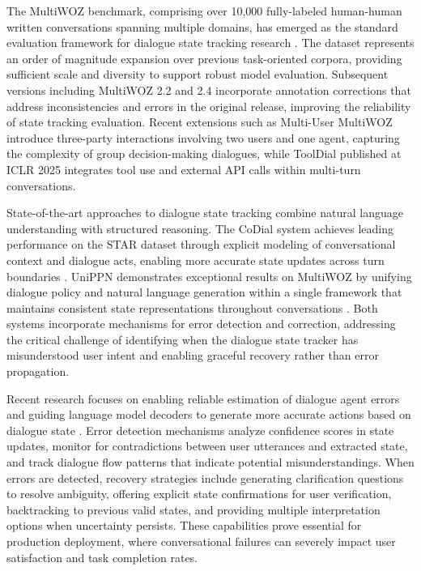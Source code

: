 The MultiWOZ benchmark, comprising over 10,000 fully-labeled human-human written conversations spanning multiple domains, has emerged as the standard evaluation framework for dialogue state tracking research \citep{budzianowski2018multiwoz}. The dataset represents an order of magnitude expansion over previous task-oriented corpora, providing sufficient scale and diversity to support robust model evaluation. Subsequent versions including MultiWOZ 2.2 and 2.4 incorporate annotation corrections that address inconsistencies and errors in the original release, improving the reliability of state tracking evaluation. Recent extensions such as Multi-User MultiWOZ introduce three-party interactions involving two users and one agent, capturing the complexity of group decision-making dialogues, while ToolDial published at ICLR 2025 integrates tool use and external API calls within multi-turn conversations.

State-of-the-art approaches to dialogue state tracking combine natural language understanding with structured reasoning. The CoDial system achieves leading performance on the STAR dataset through explicit modeling of conversational context and dialogue acts, enabling more accurate state updates across turn boundaries \citep{kim2024codial}. UniPPN demonstrates exceptional results on MultiWOZ by unifying dialogue policy and natural language generation within a single framework that maintains consistent state representations throughout conversations \citep{he2024unippn}. Both systems incorporate mechanisms for error detection and correction, addressing the critical challenge of identifying when the dialogue state tracker has misunderstood user intent and enabling graceful recovery rather than error propagation.

Recent research focuses on enabling reliable estimation of dialogue agent errors and guiding language model decoders to generate more accurate actions based on dialogue state \citep{zhao2025error}. Error detection mechanisms analyze confidence scores in state updates, monitor for contradictions between user utterances and extracted state, and track dialogue flow patterns that indicate potential misunderstandings. When errors are detected, recovery strategies include generating clarification questions to resolve ambiguity, offering explicit state confirmations for user verification, backtracking to previous valid states, and providing multiple interpretation options when uncertainty persists. These capabilities prove essential for production deployment, where conversational failures can severely impact user satisfaction and task completion rates.

